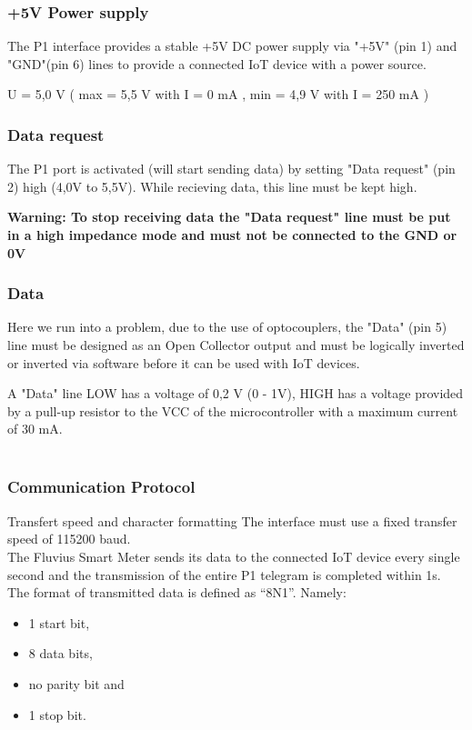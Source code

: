 \documentclass[a4paper,twoside, 12pt]{report}
\theoremstyle{break}
\begin{document}
\subsubsection{+5V Power supply}
The P1 interface provides a stable +5V DC power supply via "+5V" (pin 1) and "GND"(pin 6) lines to provide a connected IoT device with a power source.

U = 5,0 V ( max = 5,5 V with I = 0 mA , min = 4,9 V with I = 250 mA )

\subsubsection{Data request}
The P1 port is activated (will start sending data) by setting "Data request" (pin 2) high (4,0V to 5,5V). While recieving data, this line must be kept high.

\textbf{Warning: To stop receiving data the "Data request" line must be put in a high impedance mode and must not be connected to the GND or 0V}

\subsubsection{Data}
Here we run into a problem, due to the use of optocouplers, the "Data" (pin 5) line must be designed as an Open Collector output and must be logically inverted or inverted via software before it can be used with IoT devices.

A "Data" line LOW has a voltage of 0,2 V (0 - 1V), HIGH has a voltage provided by a pull-up resistor to the VCC of the microcontroller with a maximum current of 30 mA.\ \\ \ \\

\subsubsection{Communication Protocol}
Transfert speed and character formatting
The interface must use a fixed transfer speed of 115200 baud. \ \\

The Fluvius Smart Meter sends its data to the connected IoT device every single second and the transmission of the entire P1 telegram is completed within 1s. \ \\

The format of transmitted data is defined as “8N1”. Namely:

\begin{itemize}
  \item 1 start bit,
  \item 8 data bits,
  \item no parity bit and
  \item 1 stop bit.
\end{itemize}
\end{document}
